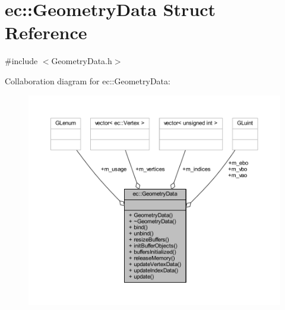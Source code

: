 \hypertarget{structec_1_1_geometry_data}{}\section{ec\+:\+:Geometry\+Data Struct Reference}
\label{structec_1_1_geometry_data}


{\ttfamily \#include $<$Geometry\+Data.\+h$>$}



Collaboration diagram for ec\+:\+:Geometry\+Data\+:\nopagebreak
\begin{figure}[H]
\begin{center}
\leavevmode
\includegraphics[width=350pt]{structec_1_1_geometry_data__coll__graph}
\end{center}
\end{figure}
